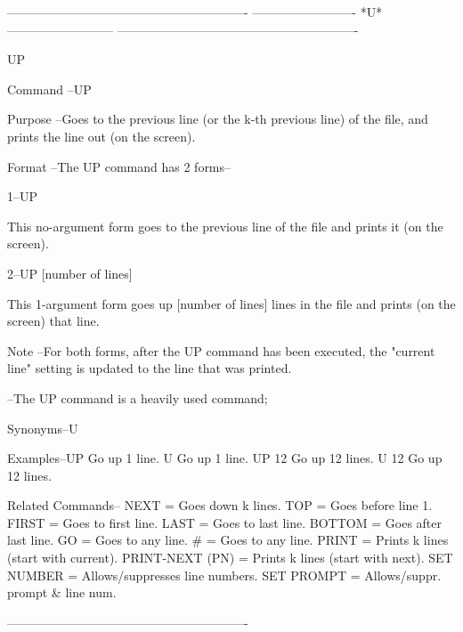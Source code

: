  
 
 
 
 
 
 
 
 
 
 
 
 
 
 
----------------------------------------------------------
-------------------------  *U*  --------------------------
----------------------------------------------------------
 
UP
 
Command --UP
 
Purpose --Goes to the previous line (or the
          k-th previous line) of the file, and
          prints the line out (on the screen).
 
Format  --The UP command has 2 forms--
 
       1--UP
 
          This no-argument form goes to the
          previous line of the file and prints it
          (on the screen).
 
       2--UP     [number of lines]
 
          This 1-argument form goes up
          [number of lines] lines in the file and
          prints (on the screen) that line.
 
Note    --For both forms, after the UP command
          has been executed, the "current line"
          setting is updated to the line that
          was printed.
 
        --The UP command is a heavily used command;
 
Synonyms--U
 
Examples--UP        Go up 1 line.
          U         Go up 1 line.
          UP 12     Go up 12 lines.
          U 12      Go up 12 lines.
 
Related Commands--
          NEXT            = Goes down k lines.
          TOP             = Goes before line 1.
          FIRST           = Goes to first line.
          LAST            = Goes to last line.
          BOTTOM          = Goes after last line.
          GO              = Goes to any line.
          #               = Goes to any line.
          PRINT           = Prints k lines (start with current).
          PRINT-NEXT (PN) = Prints k lines (start with next).
          SET NUMBER      = Allows/suppresses line numbers.
          SET PROMPT      = Allows/suppr. prompt & line num.
 
----------------------------------------------------------
 
